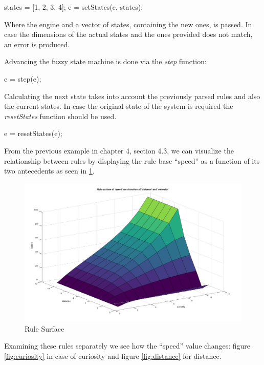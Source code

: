 \begin{octave}
states = [1, 2, 3, 4];
e = setStates(e, states);
\end{octave}

Where the engine and a vector of states, containing the new ones, is passed. In case the dimensions of the actual states and the ones provided does not match, an error is produced.

Advancing the fuzzy state machine is done via the \textit{step} function:
\begin{octave}
e = step(e);
\end{octave}

Calculating the next state takes into account the previously parsed rules and also the current states. In case the original state of the system is required the \textit{resetStates} function should be used.

\begin{octave}
e = resetStates(e);
\end{octave}

From the previous example in chapter 4, section 4.3, we can visualize the relationship between rules by displaying the rule base ``speed'' as a function of its two antecedents as seen in \ref{fig:combined}. 

\begin{figure}[!h]
\centering
	\includegraphics[width=1\textwidth]{images/rule_surface}
	\caption{Rule Surface}
	\label{fig:combined}
\end{figure}

Examining these rules separately we see how the ``speed'' value changes: figure \ref{fig:curiosity} in case of curiosity and figure \ref{fig:distance} for distance.

